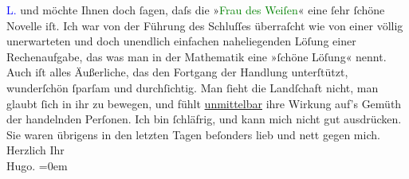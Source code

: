                         \textcolor{blue}{L.}{}\ledrightnote{\textcolor{blue}{Louis Loeb}{\newline}\textcolor{blue}{Regina Loeb}} und möchte Ihnen doch ſagen,
                    daſs die »\textcolor{green}{Frau des Weiſen}{}\ledrightnote{\textcolor{green}{Die Frau des Weisen. Erzählung}}« eine ſehr ſchöne
                    Novelle iſt. Ich war von der Führung des Schluſſes überraſcht wie von einer
                    völlig unerwarteten und {\pb}doch
                    unendlich einfachen naheliegenden Löſung einer Rechenaufgabe, das was man in der
                    Mathematik eine »ſchöne Löſung« nennt. Auch iſt alles Äußerliche, das den
                    Fortgang der Handlung unterſtützt, wunderſchön ſparſam und durchſichtig. Man
                    ſieht die Landſchaft nicht, man glaubt ſich in ihr zu bewegen, und {\pb}fühlt \uline{unmittelbar} ihre Wirkung auf’s Gemüth der handelnden
                    Perſonen.\pend
           \pstart
           Ich bin ſchläfrig, und kann mich nicht gut ausdrücken. Sie waren übrigens in den
                    letzten Tagen beſonders lieb und nett gegen mich.\pend
           \pstart
           Herzlich Ihr{\\[\baselineskip]}\spacefill\mbox{Hugo.}\pend
           \leftskip=0em{}\endnumbering{}  
      